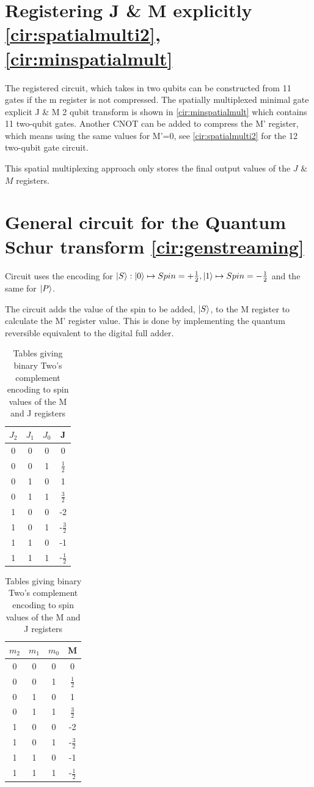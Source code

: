 \documentclass[12pt]{article}
\begin{document}
\section{Registering J \& M explicitly \autoref{cir:spatialmulti2}, \autoref{cir:minspatialmult}}

The registered circuit, which takes in two qubits can be constructed from 11 gates if the m register is not compressed. The spatially multiplexed minimal gate explicit J \& M 2 qubit transform is shown in \autoref{cir:minspatialmult} which contains 11 two-qubit gates. Another CNOT can be added to compress the M' register, which means using the same values for M'=0, see \autoref{cir:spatialmulti2} for the 12 two-qubit gate circuit.

This spatial multiplexing approach only stores the final output values of the $J$ \& $M$ registers. 

\section{General circuit for the Quantum Schur transform \autoref{cir:genstreaming}}

Circuit uses the encoding for $\left\vert{S}\right\rangle : \left\vert{0}\right\rangle \mapsto Spin = +\frac{1}{2}, \left\vert{1}\right\rangle \mapsto Spin = -\frac{1}{2}$ and the same for $\left\vert{P}\right\rangle$. 

The circuit adds the value of the spin to be added, $\left\vert{S}\right\rangle$, to the M register to calculate the M' register value. This is done by implementing the quantum reversible equivalent to the digital full adder. 

\begin{table}
\begin{tabular}{ |c c c|c| }
\hline
 $J_2$ &$J_1$ &$J_0$ &J \\
 \hline
 0 &0 &0 &0 \\ 
 0 &0 &1 &$\frac{1}{2}$ \\ 
 0 &1 &0 &1 \\ 
 0 &1 &1 &$\frac{3}{2}$ \\ 
 \hline 
 1 &0 &0 &-2 \\ 
 1 &0 &1 &-$\frac{3}{2}$ \\ 
 1 &1 &0 &-1 \\ 
 1 &1 &1 &-$\frac{1}{2}$ \\  
 \hline 
\end{tabular}
\quad
\begin{tabular}{ |c c c|c| } 
\hline
 $m_2$ &$m_1$ &$m_0$ &M \\
 \hline
 0 &0 &0 &0 \\ 
 0 &0 &1 &$\frac{1}{2}$ \\ 
 0 &1 &0 &1 \\ 
 0 &1 &1 &$\frac{3}{2}$ \\ 
 \hline 
 1 &0 &0 &-2 \\ 
 1 &0 &1 &-$\frac{3}{2}$ \\ 
 1 &1 &0 &-1 \\ 
 1 &1 &1 &-$\frac{1}{2}$ \\  
 \hline
\end{tabular}
\caption{Tables giving binary Two's complement encoding to spin values of the M and J registers}
\label{tab:encoding}
\end{table}
\end{document}
